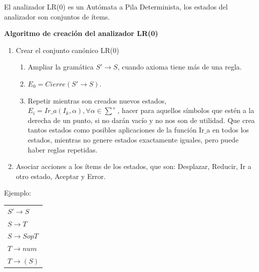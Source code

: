 \documentclass[12pt, twoside, openright]{report} %
\begin{document}
El analizador LR(0) es un Autómata a Pila Determinista, los estados del analizador son conjuntos de ítems.

\textbf{Algoritmo de creación del analizador LR(0)}
\begin{enumerate}
  \item Crear el conjunto canónico LR(0)
  \begin{enumerate}
    \item Ampliar la gramática $S'\rightarrow S$, cuando axioma tiene más de una regla.
    \item $E_0 = Cierre(S'\rightarrow S)$.
    \item Repetir mientras son creados nuevos estados, $E_i = Ir\_a(I_k, \alpha), \forall \alpha \in \sum^+$, hacer para aquellos símbolos que estén a la derecha de un punto, si no darán vacío y no nos son de utilidad. Que crea tantos estados como posibles aplicaciones de la función Ir$\_$a en todos los estados, mientras no genere estados exactamente iguales, pero puede haber reglas repetidas.
  \end{enumerate}
  \item Asociar acciones a los ítems de los estados, que son: Desplazar, Reducir, Ir a otro estado, Aceptar y Error.
\end{enumerate}

Ejemplo: 
\begin{table}[H]
  \centering
  \begin{tabular}{l}
  $S' \rightarrow S$     \\
  $S \rightarrow T$      \\
  $S \rightarrow S \textit{op} T$ \\
  $T \rightarrow \textit{num}$    \\
  $T \rightarrow ( S )$ 
  \end{tabular}
  \end{table}
  
\end{document}
